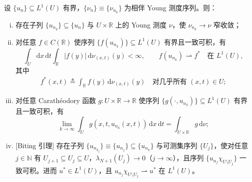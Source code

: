 \documentclass[../main.tex]{subfiles}
\begin{document}
\begin{theorem}\label{theorem:intro-0.2.2}
设 $\{u_n\}\subseteq L^1(U)$ 有界，$\{\nu_n\}\equiv\{\nu_{u_n}\}$ 为相伴 Young 测度序列。则：
\begin{enumerate}[(i)]
\item\label{item:intro-0.2.2-i} 存在子列 $\{u_{n_k}\}\subseteq\{u_n\}$ 与 $U\times\mathbb{R}$ 上的 Young 测度 $\nu$，使 $\nu_{n_k}\to\nu$ 窄收敛；
\item\label{item:intro-0.2.2-ii} 对任意 $f\in C(\mathbb{R})$ 使序列 $\{f(u_{n_k})\}\subseteq L^1(U)$ 有界且一致可积，有
\[
\int_U\mathrm{d}x\,\mathrm{d}t\int_{\mathbb{R}}|f(y)|\,\mathrm{d}\nu_{(x,t)}(y)<\infty,
\qquad
f(u_{n_k})\rightharpoonup f^* \quad \text{在 }L^1(U),
\]
其中
\begin{align}
f^*(x,t) \triangleq  \int_{\mathbb{R}}f(y)\,\mathrm{d}\nu_{(x,t)}(y)
\quad \text{对几乎所有 }(x,t)\in U; \label{align:intro-0.13}
\end{align}
\item\label{item:intro-0.2.2-iii} 对任意 Carathéodory 函数 $g:U\times\mathbb{R}\to\mathbb{R}$ 使序列 $\{g(\cdot,u_{n_k})\}\subseteq L^1(U)$ 有界且一致可积，有
\[
\lim_{k\to\infty}\int_U g(x,t,u_{n_k}(x,t))\,\mathrm{d}x\,\mathrm{d}t
= \int_{U\times\mathbb{R}}g\,\mathrm{d}\nu;
\]
\item\label{item:intro-0.2.2-iv} [Biting 引理] 存在子列 $\{u_{n_{k_j}}\}\equiv\{u_{n_j}\}\subseteq\{u_{n_k}\}$ 与可测集序列 $\{U_j\}$，使对任意 $j\in\mathbb{N}$ 有 $U_{j+1}\subseteq U_j\subseteq U$，$\lambda_{N+1}(U_j)\to0$（$j\to\infty$），且序列 $\{u_{n_j}\chi_{U\setminus U_j}\}$ 一致可积。进而 $u^*\in L^1(U)$，且 $u_{n_j}\chi_{U\setminus U_j}\rightharpoonup u^*$ 在 $L^1(U)$。
\end{enumerate}
\end{theorem}
\end{document}
